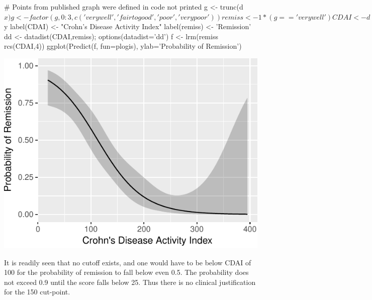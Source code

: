 \begin{Schunk}
\begin{Sinput}
# Points from published graph were defined in code not printed
g <- trunc(d$x)
g <- factor(g, 0:3, c('very well', 'fair to good', 'poor', 'very poor'))
remiss <- 1 * (g == 'very well')
CDAI <- d$y
label(CDAI) <- "Crohn's Disease Activity Index"
label(remiss) <- 'Remission'
dd <- datadist(CDAI,remiss); options(datadist='dd')
f <- lrm(remiss ~ rcs(CDAI,4))
ggplot(Predict(f, fun=plogis), ylab='Probability of Remission')
\end{Sinput}


\centerline{\includegraphics{info-devlogist-1} }

\end{Schunk}

It is readily seen that no cutoff exists, and one would have to be
below CDAI of 100 for the probability of remission to fall below even
0.5.  The probability does not exceed 0.9 until the score falls below
25.  Thus there is no clinical justification for the 150 cut-point.

